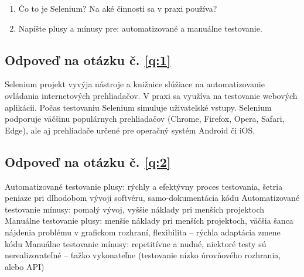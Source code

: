 \begin{enumerate}
\item Čo to je Selenium? Na aké činnosti sa v praxi používa?\label{q:1}
\item Napíšte plusy a mínusy pre: automatizované a manuálne testovanie.\label{q:2}
\end{enumerate}
\vspace{2em}
\subsection{Odpoveď na otázku č. \ref{q:1}}
\noindent Selenium projekt vyvýja nástroje a knižnice slúžiace na automatizovanie ovládania internetových prehliadačov. V praxi sa využíva na testovanie webových aplikácii. Počas testovaniu Selenium simuluje uživateľské vstupy. Selenium podporuje väčšinu populárnych prehliadačov (Chrome, Firefox, Opera, Safari, Edge), ale aj prehliadače určené pre operačný systém Android či iOS.
\vspace{2em}
\subsection{Odpoveď na otázku č. \ref{q:2}}
\noindent Automatizované testovanie plusy: rýchly a efektývny proces testovania, šetria peniaze pri dlhodobom vývoji softvéru, samo-dokumentácia kódu \newline
Automatizované testovanie mínusy: pomalý vývoj, vyššie náklady pri menších projektoch  \newline
Manuálne testovanie plusy: menšie náklady pri menších projektoch, väčšia šanca nájdenia problému v grafickom rozhraní, flexibilita -- rýchla adaptácia zmene kódu \newline
Manuálne testovanie mínusy: repetitívne a nudné, niektoré testy sú nerealizovateľné -- ťažko vykonateľne (testovanie nízko úrovňového rozhrania, alebo API) \newline